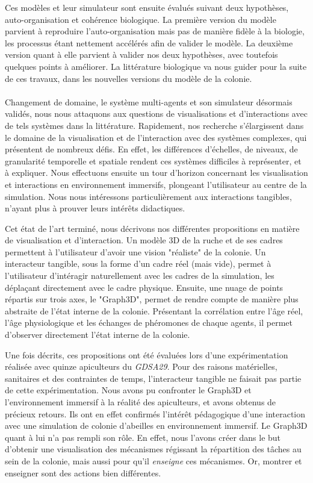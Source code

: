 Ces modèles et leur simulateur sont ensuite évalués suivant deux hypothèses, auto-organisation et cohérence biologique. La première version du modèle parvient à reproduire l'auto-organisation mais pas de manière fidèle à la biologie, les processus étant nettement accélérés afin de valider le modèle. La deuxième version quant à elle parvient à valider nos deux hypothèses, avec toutefois quelques points à améliorer. La littérature biologique va nous guider pour la suite de ces travaux, dans les nouvelles versions du modèle de la colonie.

\paragraph{}

Changement de domaine, le système multi-agents et son simulateur désormais validés, nous nous attaquons aux questions de visualisations et d'interactions avec de tels systèmes dans la littérature. Rapidement, nos recherche s'élargissent dans le domaine de la visualisation et de l'interaction avec des systèmes complexes, qui présentent de nombreux défis. En effet, les différences d'échelles, de niveaux, de granularité temporelle et spatiale rendent ces systèmes difficiles à représenter, et à expliquer. Nous effectuons ensuite un tour d'horizon concernant les visualisation et interactions en environnement immersifs, plongeant l'utilisateur au centre de la simulation. Nous nous intéressons particulièrement aux interactions tangibles, n'ayant plus à prouver leurs intérêts didactiques.

Cet état de l'art terminé, nous décrivons nos différentes propositions en matière de visualisation et d'interaction. Un modèle 3D de la ruche et de ses cadres permettent à l'utilisateur d'avoir une vision "réaliste" de la colonie. Un interacteur tangible, sous la forme d'un cadre réel (mais vide), permet à l'utilisateur d'intéragir naturellement avec les cadres de la simulation, les déplaçant directement avec le cadre physique. Ensuite, une nuage de points répartis sur trois axes, le "Graph3D", permet de rendre compte de manière plus abstraite de l'état interne de la colonie. Présentant la corrélation entre l'âge réel, l'âge physiologique et les échanges de phéromones de chaque agents, il permet d'observer directement l'état interne de la colonie.

Une fois décrits, ces propositions ont été évaluées lors d'une expérimentation réalisée avec quinze apiculteurs du \textit{GDSA29}. Pour des raisons matérielles, sanitaires et des contraintes de temps, l'interacteur tangible ne faisait pas partie de cette expérimentation. Nous avons pu confronter le Graph3D et l'environnement immersif à la réalité des apiculteurs, et avons obtenus de précieux retours. Ils ont en effet confirmés l'intérêt pédagogique d'une interaction avec une simulation de colonie d'abeilles en environnement immersif. Le Graph3D quant à lui n'a pas rempli son rôle. En effet, nous l'avons créer dans le but d'obtenir une visualisation des mécanismes régissant la répartition des tâches au sein de la colonie, mais aussi pour qu'il \textit{enseigne} ces mécanismes. Or, montrer et enseigner sont des actions bien différentes.
	
